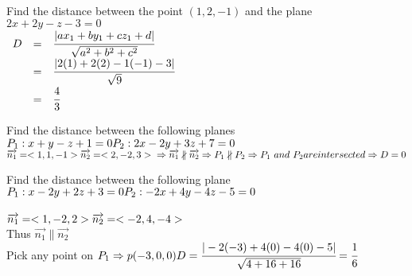 \noindent{\color{smalt(darkpowderblue)}\rule{\linewidth}{.2mm}}
\begin{example}
Find the distance between the point $(1,2,-1)$ and the plane $2x+2y-z-3=0$\\
{} 
$\begin{array}{rcl}
 D& = & \cfrac{|ax_1+by_1+cz_1+d|}{\sqrt{a^2+b^2+c^2}} \\
 & = & \cfrac{|2(1)+2(2)-1(-1)-3|}{\sqrt{9}}\\
 & = & \cfrac{4}{3}
\end{array}$
\end{example}

\noindent{\color{smalt(darkpowderblue)}\rule{\linewidth}{.2mm}}
\begin{example}
Find the distance between the following planes \\
$P_1 : x+y-z+1 =0\\
P_2 : 2x-2y+3z+7=0 $\\
{}
$\overrightarrow{n_1}=<1,1,-1> \\
\overrightarrow{n_2}=<2,-2,3> \\
\Rightarrow \overrightarrow{n_1}
\nparallel \overrightarrow{n_2} \\
\Rightarrow P_1 \nparallel P_2 \\
\Rightarrow P_1 ~ and ~ P_2  are intersected \\
\Rightarrow D=0$
\end{example}

\noindent{\color{smalt(darkpowderblue)}\rule{\linewidth}{.2mm}}
\begin{example}
Find the distance between the following plane\\ 
$P_1 : x-2y+2z+3=0 \\ 
P_2 : -2x+4y-4z-5=0 $\\
{} \\ 
$\overrightarrow{n_1}=<1,-2,2> \\
\overrightarrow{n_2}=<-2,4,-4>$ \\
Thus $ \overrightarrow{n_1} \parallel 
\overrightarrow{n_2} $\\
Pick any point on $P_1 \Rightarrow p(-3,0,0) \\
D=\cfrac{|-2(-3)+4(0)-4(0)-5|}{\sqrt{4+16+16}} =\cfrac{1}{6}$
\end{example}
\noindent{\color{smalt(darkpowderblue)}\rule{\linewidth}{.2mm}}

